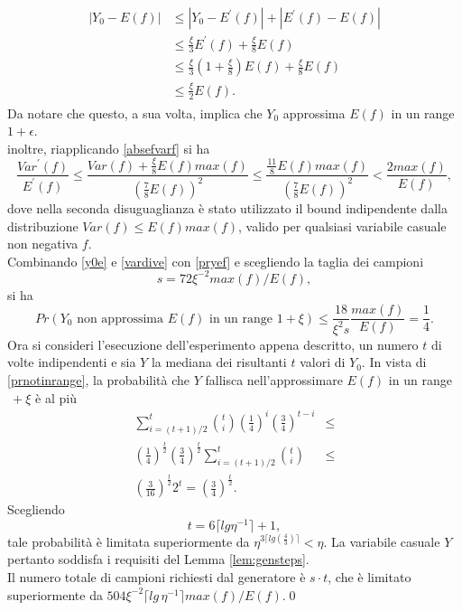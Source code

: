 \begin{align}
	\begin{split}
	|Y_0 - E(f)| &\leq |Y_0 - E^{\prime}(f)| + |E^{\prime}(f) - E(f)|\\
				 &\leq \frac{\xi}{3}E^{\prime}(f) + \frac{\xi}{8}E(f)\\
				 &\leq \frac{\xi}{3}\left(1 + \frac{\xi}{8}\right)E(f) + \frac{\xi}{8}E(f)\\
				 &\leq \frac{\xi}{2}E(f).
	\end{split}
	\label{y0e}
\end{align}
Da notare che questo, a sua volta, implica che $Y_0$ approssima $E(f)$ in un range $1 + \epsilon$.\\
inoltre, riapplicando \ref{absefvarf} si ha
\begin{equation}
	\frac{Var^{\prime}(f)}{E^{\prime}(f)} \leq \frac{Var(f) + \frac{\xi}{8}E(f)max(f)}{\left(\frac{7}{8}E(f)\right)^2} \leq \frac{\frac{11}{8}E(f)max(f)}{\left(\frac{7}{8}E(f)\right)^2} < \frac{2max(f)}{E(f)},
	\label{vardive}
\end{equation}
dove nella seconda disuguaglianza è stato utilizzato il bound indipendente dalla distribuzione $Var(f) \leq E(f)max(f)$, valido per qualsiasi variabile casuale non negativa $f$.\\
Combinando \ref{y0e} e \ref{vardive} con \ref{pryef} e scegliendo la taglia dei campioni
\begin{equation}
	s = 72\xi^{-2}max(f)/E(f),
	\label{samplesize}
\end{equation}
si ha
\begin{equation}
	Pr(Y_0 \text{ non approssima } E(f) \text{ in un range } 1 + \xi) \leq \frac{18}{\xi^2s}\frac{max(f)}{E(f)} = \frac{1}{4}.
	\label{prnotinrange}
\end{equation}
Ora si consideri l'esecuzione dell'esperimento appena descritto, un numero $t$ di volte indipendenti e sia $Y$ la mediana dei risultanti $t$ valori di $Y_0$. In vista di \ref{prnotinrange}, la probabilità che $Y$ fallisca nell'approssimare $E(f)$ in un range $\ + \xi$ è al più
\begin{align}
	\sum_{i=(t+1)/2}^{t}{\binom{t}{i}\left(\frac{1}{4}\right)^i\left(\frac{3}{4}\right)^{t-i}} &\leq\nonumber\\ \left(\frac{1}{4}\right)^{\frac{t}{2}}\left(\frac{3}{4}\right)^{\frac{t}{2}}\sum_{i=(t+1)/2}^{t}{\binom{t}{i}} &\leq\nonumber\\
	\left(\frac{3}{16}\right)^{\frac{t}{2}}2^t = \left(\frac{3}{4}\right)^{\frac{t}{2}}.
	\label{pryfail}
\end{align}
Scegliendo
\begin{equation}
	t = 6\lceil lg \eta^{-1}\rceil + 1,
	\label{t}
\end{equation}
tale probabilità è limitata superiormente da $\eta^{3\lceil lg(\frac{4}{3})\rceil} < \eta$. La variabile casuale $Y$ pertanto soddisfa i requisiti del Lemma \ref{lem:gensteps}.\\
Il numero totale di campioni richiesti dal generatore è $s \cdot t$, che è limitato superiormente da $504\xi^{-2}\lceil lg\,\eta^{-1}\rceil max(f)/E(f)$.\qed
